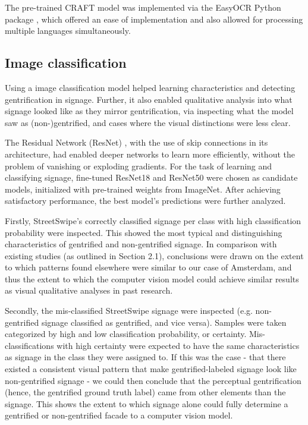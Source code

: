 The pre-trained CRAFT model was implemented via the EasyOCR Python package \cite{noauthor_jaided_nodate}, which offered an ease of implementation and also allowed for processing multiple languages simultaneously.

\subsection{Image classification}

Using a image classification model helped learning characteristics and detecting gentrification in signage. Further, it also enabled qualitative analysis into what signage looked like as they mirror gentrification, via inspecting what the model saw as (non-)gentrified, and cases where the visual distinctions were less clear.

The Residual Network (ResNet) \cite{resnet}, with the use of skip connections in its architecture, had enabled deeper networks to learn more efficiently, without the problem of vanishing or exploding gradients. For the task of learning and classifying signage, fine-tuned ResNet18 and ResNet50 were chosen as candidate models, initialized with pre-trained weights from ImageNet. After achieving satisfactory performance, the best model's predictions were further analyzed. 

Firstly, StreetSwipe's correctly classified signage per class with high classification probability were inspected. This showed the most typical and distinguishing characteristics of gentrified and non-gentrified signage. In comparison with existing studies (as outlined in Section 2.1), conclusions were drawn on the extent to which patterns found elsewhere were similar to our case of Amsterdam, and thus the extent to which the computer vision model could achieve similar results as visual qualitative analyses in past research.

Secondly, the mis-classified StreetSwipe signage were inspected (e.g. non-gentrified signage classified as gentrified, and vice versa). Samples were taken categorized by high and low classification probability, or certainty. Mis-classifications with high certainty were expected to have the same characteristics as signage in the class they were assigned to. If this was the case - that there existed a consistent visual pattern that make gentrified-labeled signage look like non-gentrified signage - we could then conclude that the perceptual gentrification (hence, the gentrified ground truth label) came from other elements than the signage. This shows the extent to which signage alone could fully determine a gentrified or non-gentrified facade to a computer vision model.

